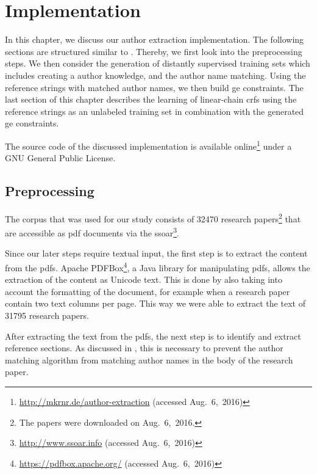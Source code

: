 \chapter{Implementation}\label{cha:implementation}

In this chapter, we discuss our author extraction implementation.
The following sections are structured similar to .
Thereby, we first look into the preprocessing steps.
We then consider the generation of distantly supervised training sets which includes creating a author knowledge, and the author name matching.
Using the reference strings with matched author names, we then build \gls{ge} constraints.
The last section of this chapter describes the learning of \glspl{linear-chain crf} using the reference strings as an unlabeled training set in combination with the generated \gls{ge} constraints.

The source code of the discussed implementation is available online\footnote{\url{http://mkrnr.de/author-extraction} (accessed Aug.~6,~2016)} under a GNU General Public License.

\section{Preprocessing}\label{sec:i-preprocessing}

The corpus that was used for our study consists of \num{32470} research papers\footnote{The papers were downloaded on Aug.~6,~2016.} that are accessible as \gls{pdf} documents via the \gls{ssoar}\footnote{\url{http://www.ssoar.info} (accessed Aug.~6,~2016)}.

Since our later steps require textual input, the first step is to extract the content from the \glspl{pdf}.
Apache PDFBox\footnote{\url{https://pdfbox.apache.org/} (accessed Aug.~6,~2016)}, a Java library for manipulating \glspl{pdf}, allows the extraction of the content as Unicode text.
This is done by also taking into account the formatting of the document, for example when a research paper contain two text columns per page.
This way we were able to extract the text of \num{31795} research papers.

\bigskip

After extracting the text from the \glspl{pdf}, the next step is to identify and extract reference sections.
As discussed in , this is necessary to prevent the author matching algorithm from matching author names in the body of the research paper.

